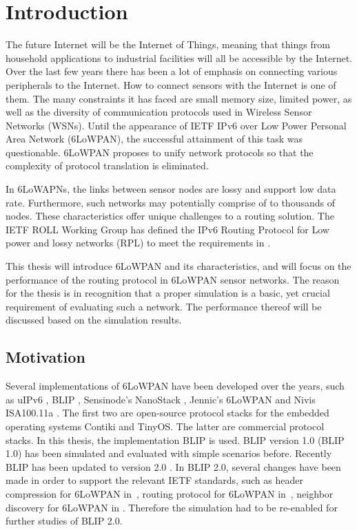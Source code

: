 \chapter{Introduction}
\label{1.0 Intr}

The future Internet will be the Internet of Things, meaning that things from household
applications to industrial facilities will all be accessible by the Internet. Over the last few years there has been a lot of emphasis on connecting various peripherals to the Internet. How to connect sensors with the Internet is one of them. The many constraints it has faced are small memory size, limited power,  as well as the diversity of communication protocols used in Wireless Sensor Networks (WSNs)\@. Until the appearance of IETF IPv6 over Low Power Personal Area Network (6LoWPAN)\@, the successful attainment of this task was questionable. 6LoWPAN proposes to unify network protocols so that the complexity of protocol translation is eliminated. 

In 6LoWAPNs, the links between sensor nodes are lossy and support low data rate. Furthermore, such networks may potentially comprise of to thousands of nodes. These characteristics offer unique challenges to a routing solution. The IETF ROLL Working Group has defined the IPv6 Routing Protocol for Low power and lossy networks (RPL) to meet the requirements in \cite{draft-ietf-roll-rpl-19}.

This thesis will introduce 6LoWPAN and its characteristics, and will focus on the performance of the routing protocol in 6LoWPAN sensor networks. The reason for the thesis is in recognition that a proper simulation is a basic, yet crucial requirement of evaluating such a network. The performance thereof will be discussed based on the simulation results.

\section{Motivation}
\label{Intr:Motiv}

Several implementations of 6LoWPAN have been developed over the years, such as uIPv6 \cite{uIPv6}, BLIP \cite{BLIP}, Sensinode's NanoStack \cite{Sensinode}, Jennic's 6LoWPAN \cite{Jennic} and Nivis ISA100.11a \cite{Nivis}. The first two are open-source protocol stacks for the embedded operating systems Contiki and TinyOS. The latter are commercial protocol stacks. In this thesis, the implementation BLIP is used. BLIP version 1.0 (BLIP 1.0) has been simulated and evaluated with simple scenarios before. Recently BLIP has been updated to version 2.0 \cite{BLIP2.0}\@. In BLIP 2.0, several changes have been made in order to support the relevant IETF standards, such as header compression for 6LoWPAN in~\cite{draft-ietf-6lowpan-hc-15}, routing protocol for 6LoWPAN in~\cite{draft-ietf-roll-rpl-19}, neighbor discovery for 6LoWPAN in \cite{draft-ietf-6lowpan-nd-17}. 
Therefore the simulation had to be re-enabled for further studies of BLIP 2.0. 

